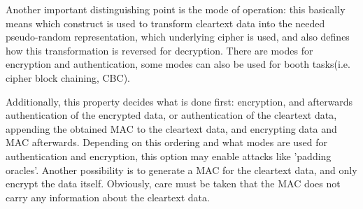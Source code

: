 \documentclass[a4paper,12pt,twoside]{memoir}
\begin{document}
 Another important distinguishing point is the mode of operation: this basically means which construct is used to transform cleartext data
 into the needed pseudo-random representation, which underlying cipher is used, and also defines how this transformation is reversed for decryption.
 There are modes for encryption and authentication, some modes can also be used for booth tasks(i.e. cipher block chaining, CBC). 
 
 Additionally, this property decides what
 is done first: encryption, and afterwards authentication of the encrypted data, or authentication of the cleartext data,
 appending the obtained MAC to the cleartext data, and encrypting data and MAC afterwards. Depending on this ordering and
 what modes are used for authentication and encryption, this option may enable attacks like 'padding oracles'\cite{Vaudenay02securityflaws}. Another possibility
 is to generate a MAC for the cleartext data, and only encrypt the data itself. Obviously, care must be taken that the MAC does not
 carry any information about the cleartext data.
 
\end{document}

